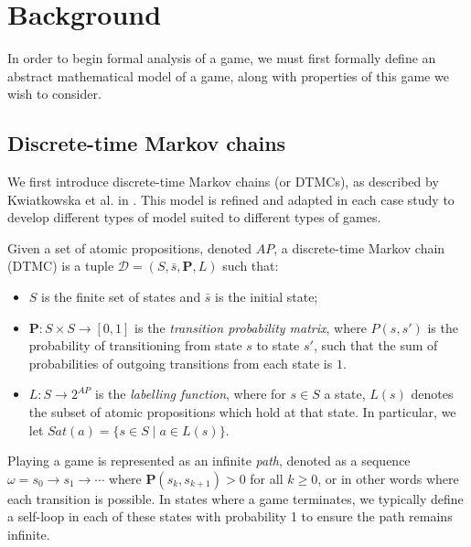 
\chapter{Background}
\label{background}

In order to begin formal analysis of a game, we must first formally define an abstract mathematical model of a game, along with properties of this game we wish to consider.

\section{Discrete-time Markov chains}
\label{back:stoc_game}

We first introduce discrete-time Markov chains (or DTMCs), as described by Kwiatkowska et al. in \cite{kwiatkowska_stochastic_2007}. This model is refined and adapted in each case study to develop different types of model suited to different types of games.

\begin{definition}
\label{back:dtmc}
    Given a set of atomic propositions, denoted $AP$, a discrete-time Markov chain (DTMC) is a tuple $\mathcal{D} = (S, \bar{s}, \mathbf{P}, L)$ such that:

    \begin{itemize}
        \item $S$ is the finite set of states and $\bar{s}$ is the initial state;
        \item $\mathbf{P} : S \times S \rightarrow [0,1]$ is the \emph{transition probability matrix}, where $P(s, s')$ is the probability of transitioning from state $s$ to state $s'$, such that the sum of probabilities of outgoing transitions from each state is $1$.
        \item $L: S \rightarrow 2^{AP}$ is the \emph{labelling function}, where for $s \in S$ a state, $L(s)$ denotes the subset of atomic propositions which hold at that state. In particular, we let $Sat(a) = \{s \in S \mid a \in L(s)\}$.
    \end{itemize}
\end{definition}

Playing a game is represented as an infinite \emph{path}, denoted as a sequence $\omega = s_0 \rightarrow s_1 \rightarrow \cdots$ where $\mathbf{P}(s_k, s_{k+1})>0$ for all $k\geq0$, or in other words where each transition is possible. In states where a game terminates, we typically define a self-loop in each of these states with probability 1 to ensure the path remains infinite.


